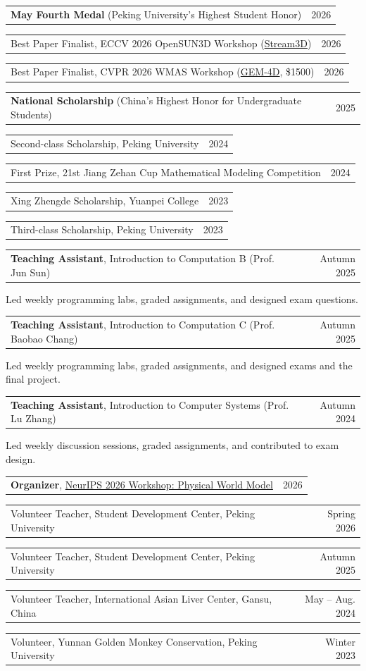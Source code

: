 \documentclass[10pt, letterpaper]{article}
\makeatletter
\newlength{\cvcontentoffset}
\newif\ifcvfirstsection
\newif\ifshowsectiondividers
\newcommand{\cvdivider}{%
    \par\vspace{0.17cm}%
    \noindent\hspace*{\cvcontentoffset}%
    \makebox[\dimexpr\linewidth-\cvcontentoffset\relax][l]{%
        \ifshowsectiondividers
            {\color{dividerColor}\xleaders\hbox{\rule{4pt}{0.35pt}\hspace{3pt}}\hfill\kern0pt}%
        \else
            \rule{0pt}{0.35pt}%
        \fi
    }%
    \par\vspace{0.15cm}%
}
\newcommand{\cvsection}[2]{%
    \ifcvfirstsection
        \global\cvfirstsectionfalse
        \vspace{0.24cm}
    \else
        \cvdivider
    \fi
    \begin{cvblocks}
        \item[#1] #2
    \end{cvblocks}
}
\newcommand{\datedline}[2]{%
    \noindent
    \begin{tabularx}{\linewidth}{@{}X@{\hspace{0.45cm}}r@{}}
        #1 & #2
    \end{tabularx}\par
}
\newcommand{\recordgap}{\vspace{0.13cm}}
\newcommand{\entrygap}{\vspace{0.18cm}}
\makeatother
\begin{document}
\cvsection{Honors and\\Awards}{
    \datedline{\textbf{May Fourth Medal} (Peking University's Highest Student Honor)}{2026}
    \recordgap
    \datedline{Best Paper Finalist, ECCV 2026 OpenSUN3D Workshop (\href{https://arxiv.org/abs/2605.21472}{Stream3D})}{2026}
    \recordgap
    \datedline{Best Paper Finalist, CVPR 2026 WMAS Workshop (\href{https://arxiv.org/abs/2605.22882}{GEM-4D}, \$1500)}{2026}
    \recordgap
    \datedline{\textbf{National Scholarship} (China's Highest Honor for Undergraduate Students)}{2025}
    \recordgap
    \datedline{Second-class Scholarship, Peking University}{2024}
    \recordgap
    \datedline{First Prize, 21st Jiang Zehan Cup Mathematical Modeling Competition}{2024}
    \recordgap
    \datedline{Xing Zhengde Scholarship, Yuanpei College}{2023}
    \recordgap
    \datedline{Third-class Scholarship, Peking University}{2023}
}

\cvsection{Teaching\\Experience}{
    \datedline{\textbf{Teaching Assistant}, Introduction to Computation B (Prof. Jun Sun)}{Autumn 2025}
    Led weekly programming labs, graded assignments, and designed exam questions.\par
    \entrygap
    \datedline{\textbf{Teaching Assistant}, Introduction to Computation C (Prof. Baobao Chang)}{Autumn 2025}
    Led weekly programming labs, graded assignments, and designed exams and the final project.\par
    \entrygap
    \datedline{\textbf{Teaching Assistant}, Introduction to Computer Systems (Prof. Lu Zhang)}{Autumn 2024}
    Led weekly discussion sessions, graded assignments, and contributed to exam design.
}

\cvsection{Service and\\Outreach}{
    \datedline{\textbf{Organizer}, \href{https://physworld-org.github.io/physworld.github.io/}{NeurIPS 2026 Workshop: Physical World Model}}{2026}
    \recordgap
    \datedline{Volunteer Teacher, Student Development Center, Peking University}{Spring 2026}
    \recordgap
    \datedline{Volunteer Teacher, Student Development Center, Peking University}{Autumn 2025}
    \recordgap
    \datedline{Volunteer Teacher, International Asian Liver Center, Gansu, China}{May -- Aug. 2024}
    \recordgap
    \datedline{Volunteer, Yunnan Golden Monkey Conservation, Peking University}{Winter 2023}
}
\end{document}
